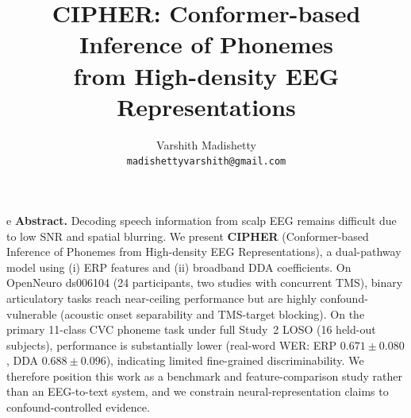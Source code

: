 \documentclass[11pt,a4paper]{article}
\title{%
  \textbf{CIPHER: Conformer-based Inference of Phonemes}\\
  \textbf{from High-density EEG Representations}
}
\author{%
  Varshith Madishetty\\
  \small\texttt{madishettyvarshith@gmail.com}
}
\date{}
\begin{document}
\maketitle
\thispagestyle{empty}

\begin{mdframed}[backgroundcolor=gray!8, linecolor=gray!40, linewidth=0.8pt,
                 innerleftmargin=10pt, innerrightmargin=10pt,
                 innertopmargin=8pt, innerbottommargin=8pt]e
\textbf{Abstract.}
Decoding speech information from scalp EEG remains difficult due to low SNR
and spatial blurring. We present \textbf{CIPHER} (Conformer-based Inference
of Phonemes from High-density EEG Representations), a dual-pathway model
using (i) ERP features and (ii) broadband DDA coefficients. On OpenNeuro
ds006104 (24 participants, two studies with concurrent TMS), binary
articulatory tasks reach near-ceiling performance but are highly
confound-vulnerable (acoustic onset separability and TMS-target blocking).
On the primary 11-class CVC phoneme task under full Study~2 LOSO (16
held-out subjects), performance is substantially lower (real-word WER:
ERP $0.671 \pm 0.080$, DDA $0.688 \pm 0.096$), indicating limited
fine-grained discriminability. We therefore position this work as a
benchmark and feature-comparison study rather than an EEG-to-text system,
and we constrain neural-representation claims to confound-controlled evidence.
\end{mdframed}

\tableofcontents
\newpage
\end{document}
